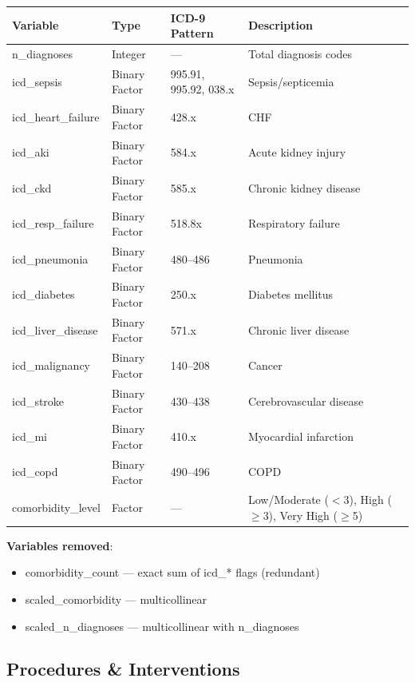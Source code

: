 \documentclass[11pt]{article}
\begin{document}
\begin{longtable}{L{3.5cm}L{1.5cm}L{3cm}L{5cm}}
\toprule
\textbf{Variable} & \textbf{Type} & \textbf{ICD-9 Pattern} & \textbf{Description} \\
\midrule
\endhead
n\_diagnoses & Integer & --- & Total diagnosis codes \\
icd\_sepsis & Binary Factor & 995.91, 995.92, 038.x & Sepsis/septicemia \\
icd\_heart\_failure & Binary Factor & 428.x & CHF \\
icd\_aki & Binary Factor & 584.x & Acute kidney injury \\
icd\_ckd & Binary Factor & 585.x & Chronic kidney disease \\
icd\_resp\_failure & Binary Factor & 518.8x & Respiratory failure \\
icd\_pneumonia & Binary Factor & 480--486 & Pneumonia \\
icd\_diabetes & Binary Factor & 250.x & Diabetes mellitus \\
icd\_liver\_disease & Binary Factor & 571.x & Chronic liver disease \\
icd\_malignancy & Binary Factor & 140--208 & Cancer \\
icd\_stroke & Binary Factor & 430--438 & Cerebrovascular disease \\
icd\_mi & Binary Factor & 410.x & Myocardial infarction \\
icd\_copd & Binary Factor & 490--496 & COPD \\
comorbidity\_level & Factor & --- & Low/Moderate ($<$3), High ($\geq$3), Very High ($\geq$5) \\
\bottomrule
\end{longtable}

\textbf{Variables removed}:
\begin{itemize}[leftmargin=*, nosep]
    \item comorbidity\_count --- exact sum of icd\_* flags (redundant)
    \item scaled\_comorbidity --- multicollinear
    \item scaled\_n\_diagnoses --- multicollinear with n\_diagnoses
\end{itemize}

\subsection{Procedures \& Interventions}
\end{document}
